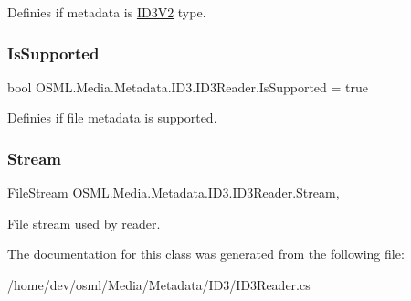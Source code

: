 Definies if metadata is \mbox{\hyperlink{classOSML_1_1Media_1_1Metadata_1_1ID3_1_1ID3V2}{I\+D3\+V2}} type. 

\mbox{\label{classOSML_1_1Media_1_1Metadata_1_1ID3_1_1ID3Reader_aaff60ceaf8e5bcafe091cc8811df82ad}} 
\subsubsection{\texorpdfstring{IsSupported}{IsSupported}}
{\footnotesize\ttfamily bool O\+S\+M\+L.\+Media.\+Metadata.\+I\+D3.\+I\+D3\+Reader.\+Is\+Supported = true\hspace{0.3cm}{\ttfamily [get]}}



Definies if file metadata is supported. 

\mbox{\label{classOSML_1_1Media_1_1Metadata_1_1ID3_1_1ID3Reader_a30391f033a3b1d5fb7a5d816993c05e0}} 
\subsubsection{\texorpdfstring{Stream}{Stream}}
{\footnotesize\ttfamily File\+Stream O\+S\+M\+L.\+Media.\+Metadata.\+I\+D3.\+I\+D3\+Reader.\+Stream\hspace{0.3cm}{\ttfamily [get]}, {\ttfamily [set]}}



File stream used by reader. 



The documentation for this class was generated from the following file\+:\begin{DoxyCompactItemize}
\item 
/home/dev/osml/\+Media/\+Metadata/\+I\+D3/I\+D3\+Reader.\+cs\end{DoxyCompactItemize}
